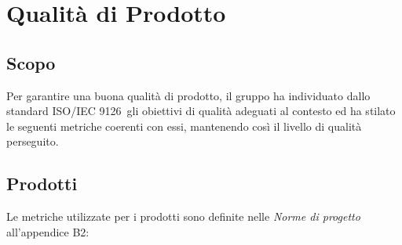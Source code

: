 \section{Qualità di Prodotto}
\subsection{Scopo}
Per garantire una buona qualità di prodotto, il gruppo ha individuato dallo standard ISO/IEC 9126\pedice~gli obiettivi di qualità adeguati al contesto ed ha stilato le seguenti metriche coerenti con essi, mantenendo così il livello di qualità perseguito.

\subsection{Prodotti}
Le metriche utilizzate per i prodotti sono definite nelle \textit{Norme di progetto} all'appendice B2:
\newpage
